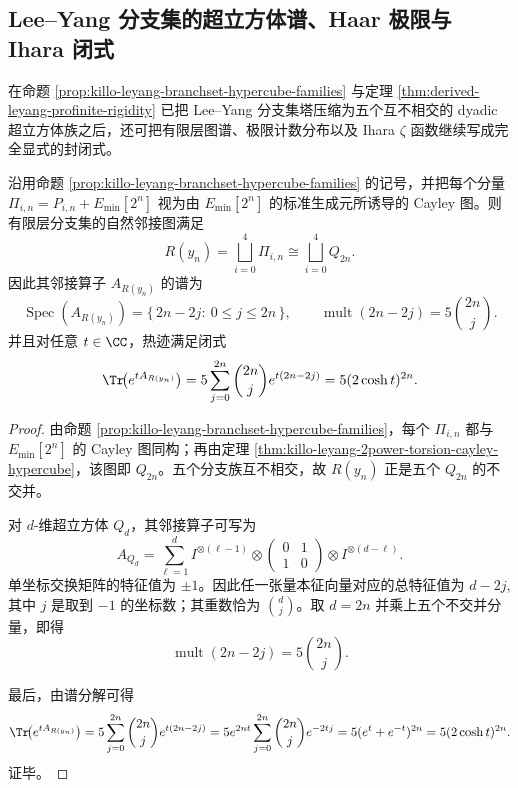\subsection{Lee--Yang 分支集的超立方体谱、Haar 极限与 Ihara 闭式}

在命题 \ref{prop:killo-leyang-branchset-hypercube-families} 与定理 \ref{thm:derived-leyang-profinite-rigidity} 已把 Lee--Yang 分支集塔压缩为五个互不相交的 dyadic 超立方体族之后，还可把有限层图谱、极限计数分布以及 Ihara \(\zeta\) 函数继续写成完全显式的封闭式。

\begin{theorem}\label{thm:derived-leyang-branchset-adjacency-spectrum-heat-trace}
沿用命题 \ref{prop:killo-leyang-branchset-hypercube-families} 的记号，并把每个分量
\(
\Pi_{i,n}=P_{i,n}+E_{\min}[2^n]
\)
视为由 \(E_{\min}[2^n]\) 的标准生成元所诱导的 Cayley 图。则有限层分支集的自然邻接图满足
\[
R(y_n)=\bigsqcup_{i=0}^{4}\Pi_{i,n}
\cong
\bigsqcup_{i=0}^{4}Q_{2n}.
\]
因此其邻接算子 \(A_{R(y_n)}\) 的谱为
\[
\operatorname{Spec}(A_{R(y_n)})
=
\bigl\{\,2n-2j:\ 0\le j\le 2n\,\bigr\},
\qquad
\operatorname{mult}(2n-2j)=5\binom{2n}{j}.
\]
并且对任意 \(t\in\CC\)，热迹满足闭式
\[
\Tr\!\bigl(e^{tA_{R(y_n)}}\bigr)
=
5\sum_{j=0}^{2n}\binom{2n}{j}e^{t(2n-2j)}
=
5(2\cosh t)^{2n}.
\]
\end{theorem}

\begin{proof}
由命题 \ref{prop:killo-leyang-branchset-hypercube-families}，每个 \(\Pi_{i,n}\) 都与 \(E_{\min}[2^n]\) 的 Cayley 图同构；再由定理 \ref{thm:killo-leyang-2power-torsion-cayley-hypercube}，该图即 \(Q_{2n}\)。五个分支族互不相交，故 \(R(y_n)\) 正是五个 \(Q_{2n}\) 的不交并。

对 \(d\)-维超立方体 \(Q_d\)，其邻接算子可写为
\[
A_{Q_d}
=
\sum_{\ell=1}^{d}
I^{\otimes(\ell-1)}
\otimes
\begin{pmatrix}
0&1\\
1&0
\end{pmatrix}
\otimes
I^{\otimes(d-\ell)}.
\]
单坐标交换矩阵的特征值为 \(\pm1\)。因此任一张量本征向量对应的总特征值为
\(
d-2j
\),
其中 \(j\) 是取到 \(-1\) 的坐标数；其重数恰为 \(\binom{d}{j}\)。取 \(d=2n\) 并乘上五个不交并分量，即得
\[
\operatorname{mult}(2n-2j)=5\binom{2n}{j}.
\]

最后，由谱分解可得
\[
\Tr\!\bigl(e^{tA_{R(y_n)}}\bigr)
=
5\sum_{j=0}^{2n}\binom{2n}{j}e^{t(2n-2j)}
=
5e^{2nt}\sum_{j=0}^{2n}\binom{2n}{j}e^{-2tj}
=
5(e^t+e^{-t})^{2n}
=
5(2\cosh t)^{2n}.
\]
证毕。
\end{proof}

